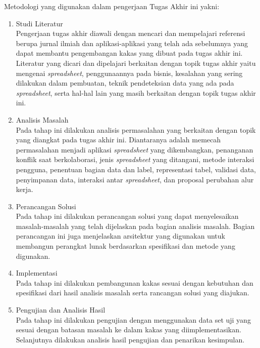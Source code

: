 Metodologi yang digunakan dalam pengerjaan Tugas Akhir ini yakni:
\begin{enumerate}
    \item Studi Literatur \\
    Pengerjaan tugas akhir diawali dengan mencari dan mempelajari referensi berupa jurnal ilmiah dan aplikasi-aplikasi yang telah ada sebelumnya yang dapat membantu pengembangan kakas yang dibuat pada tugas akhir ini. Literatur yang dicari dan dipelajari berkaitan dengan topik tugas akhir yaitu mengenai \textit{spreadsheet}, penggunaannya pada bisnis, kesalahan yang sering dilakukan dalam pembuatan, teknik pendeteksian data yang ada pada \textit{spreadsheet}, serta hal-hal lain yang masih berkaitan dengan topik tugas akhir ini. 
    
    \item Analisis Masalah \\
    Pada tahap ini dilakukan analisis permasalahan yang berkaitan dengan topik yang diangkat pada tugas akhir ini. Diantaranya adalah memecah permasalahan menjadi aplikasi \textit{spreadsheet} yang dikembangkan, penanganan konflik saat berkolaborasi, jenis \textit{spreadsheet} yang ditangani, metode interaksi pengguna, penentuan bagian data dan label, representasi tabel, validasi data, penyimpanan data, interaksi antar \textit{spreadsheet}, dan proposal perubahan alur kerja.

    \item Perancangan Solusi \\
    Pada tahap ini dilakukan perancangan solusi yang dapat menyelesaikan masalah-masalah yang telah dijelaskan pada bagian analisis masalah. Bagian perancangan ini juga menjelaskan arsitektur yang digunakan untuk membangun perangkat lunak berdasarkan spesifikasi dan metode yang digunakan.

    \item Implementasi \\
    Pada tahap ini dilakukan pembangunan kakas sesuai dengan kebutuhan dan spesifikasi dari hasil analisis masalah serta rancangan solusi yang diajukan.

    \item Pengujian dan Analisis Hasil \\
    Pada tahap ini dilakukan pengujian dengan menggunakan data set uji yang sesuai dengan batasan masalah ke dalam kakas yang diimplementasikan. Selanjutnya dilakukan analisis hasil pengujian dan penarikan kesimpulan.

\end{enumerate}

